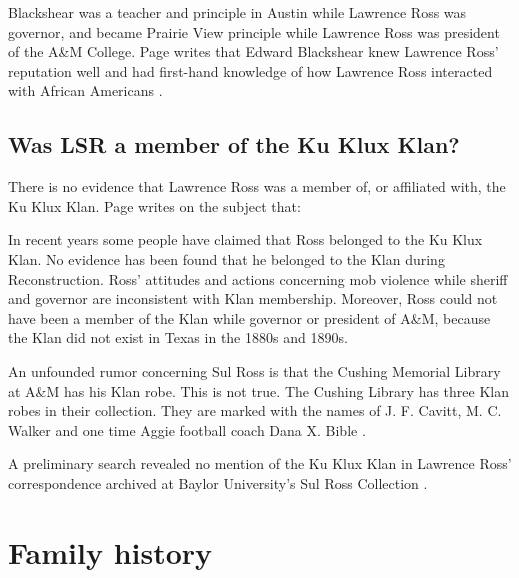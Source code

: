 \documentclass[12pt]{article}
\begin{document}
Blackshear was a teacher and principle in Austin while Lawrence Ross was governor, and became Prairie View principle while Lawrence Ross was president of the A\&M College. Page writes that Edward Blackshear knew Lawrence Ross' reputation well and had first-hand knowledge of how Lawrence Ross interacted with African Americans \cite{page:email:blackshear}. 

\newpage
\subsection{Was LSR a member of the Ku Klux Klan?}
There is no evidence that Lawrence Ross was a member of, or affiliated with, the Ku Klux Klan. Page writes on the subject that:

\begin{displayquote}
In recent years some people have claimed that Ross belonged to the Ku Klux Klan.  No evidence has been found that he belonged to the Klan during Reconstruction.  Ross’ attitudes and actions concerning mob violence while sheriff and governor are inconsistent with Klan membership.  Moreover, Ross could not have been a member of the Klan while governor or president of A\&M, because the Klan did not exist in Texas in the 1880s and 1890s.

An unfounded rumor concerning Sul Ross is that the Cushing Memorial Library at A\&M has his Klan robe.  This is not true.  The Cushing Library has three Klan robes in their collection.  They are marked with the names of J. F. Cavitt, M. C. Walker and one time Aggie football coach Dana X. Bible \cite[pg. 253]{page}.
\end{displayquote}

A preliminary search revealed no mention of the Ku Klux Klan in Lawrence Ross' correspondence archived at Baylor University's Sul Ross Collection \cite{vaughan:email}.

\newpage
\section{Family history}
\end{document}
